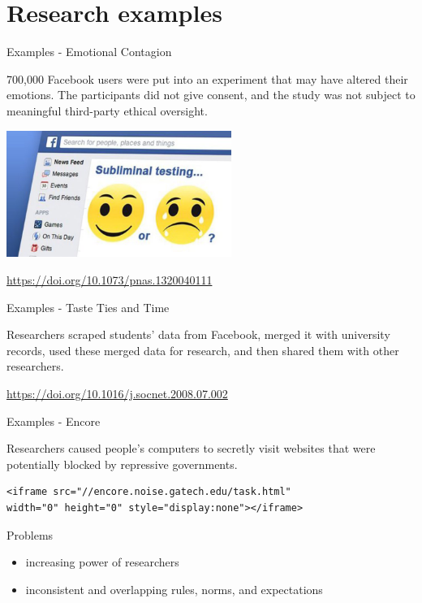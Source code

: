 \documentclass{beamer}
\def\vf{\vfill}
\begin{document}
\section{Research examples}
\begin{frame}{Examples - Emotional Contagion}

700,000 Facebook users were put into an experiment that may
have altered their emotions. The participants did not give consent,
and the study was not subject to meaningful third-party ethical
oversight.

\begin{center}
	\includegraphics[width=0.55\textwidth]{figures/emotional_contagion.jpg}
\end{center}

\vf
\tiny{\url{https://doi.org/10.1073/pnas.1320040111}}
\end{frame}

\begin{frame}{Examples - Taste Ties and Time}

Researchers scraped students’ data from Facebook, merged it with
university records, used these merged data for research, and then
shared them with other researchers.

\vf
\tiny{\url{https://doi.org/10.1016/j.socnet.2008.07.002}}
\end{frame}

\begin{frame}[fragile]{Examples - Encore}

Researchers caused people's computers to secretly visit websites
that were potentially blocked by repressive governments.

\vspace{2mm}
\begin{lstlisting}
<iframe src="//encore.noise.gatech.edu/task.html" 
width="0" height="0" style="display:none"></iframe>
\end{lstlisting}

\end{frame}


\begin{frame}{Problems}

\begin{itemize}
\item increasing power of researchers
\item inconsistent and overlapping rules, norms, and expectations
\end{itemize}

\end{frame}
\end{document}
